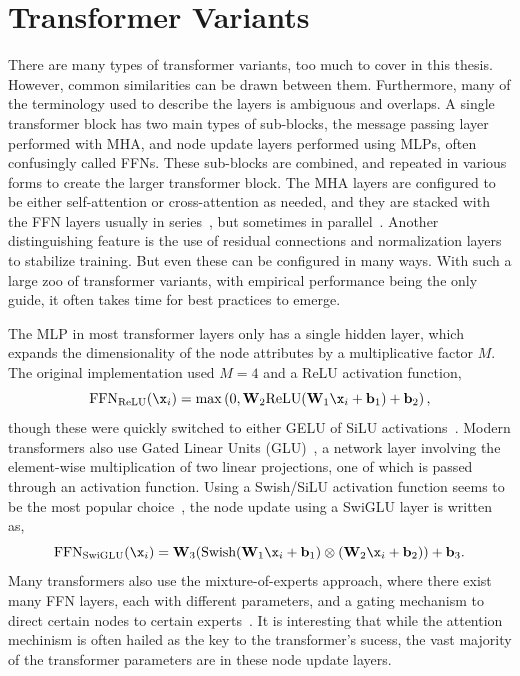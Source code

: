 \section{Transformer Variants}

There are many types of transformer variants, too much to cover in this thesis.
However, common similarities can be drawn between them.
Furthermore, many of the terminology used to describe the layers is ambiguous and overlaps.
A single transformer block has two main types of sub-blocks, the message passing layer performed with MHA, and node update layers performed using MLPs, often confusingly called FFNs.
These sub-blocks are combined, and repeated in various forms to create the larger transformer block.
The MHA layers are configured to be either self-attention or cross-attention as needed, and they are stacked with the FFN layers usually in series~, but sometimes in parallel~.
Another distinguishing feature is the use of residual connections and normalization layers to stabilize training.
But even these can be configured in many ways.
With such a large zoo of transformer variants, with empirical performance being the only guide, it often takes time for best practices to emerge.

The MLP in most transformer layers only has a single hidden layer, which expands the dimensionality of the node attributes by a multiplicative factor $M$.
The original implementation used $M=4$ and a ReLU activation function,
\begin{equation}
    \text{FFN}_\text{ReLU}(\x_i) = \max\left(0, \mathbf{W}_2 \text{ReLU}(\mathbf{W}_1 \x_i + \mathbf{b}_1) + \mathbf{b}_2\right),
\end{equation}
though these were quickly switched to either GELU of SiLU activations~.
Modern transformers also use Gated Linear Units (GLU)~, a network layer involving the element-wise multiplication of two linear projections, one of which is passed through an activation function.
Using a Swish/SiLU activation function seems to be the most popular choice~, the node update using a SwiGLU layer is written as,
\begin{equation}
    \text{FFN}_\text{SwiGLU}(\x_i) = \mathbf{W}_3(\text{Swish}(\mathbf{W}_1 \x_i + \mathbf{b}_1) \otimes (\mathbf{W}_2 \x_i + \mathbf{b}_2)) + \mathbf{b}_3.
\end{equation}
Many transformers also use the mixture-of-experts approach, where there exist many FFN layers, each with different parameters, and a gating mechanism to direct certain nodes to certain experts~.
It is interesting that while the attention mechinism is often hailed as the key to the transformer's sucess, the vast majority of the transformer parameters are in these node update layers.

